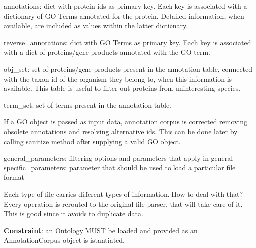 \documentclass[letterpaper,10pt,english]{sphinxmanual}
\begin{document}
annotations: dict with protein ids as primary key. Each key is associated with a dictionary of GO Terms annotated for the protein. Detailed information, when available, are included as values within the latter dictionary.

reverse\_annotations: dict with GO Terms as primary key. Each key is associated with a dict of proteins/gene products annotated with the GO term.

obj\_set: set of proteins/gene products present in the annotation table, connected with the taxon id of the organism they belong to, when this information is available. This table is useful to filter out proteins from uninteresting species.

term\_set: set of terms present in the annotation table.

If a GO object is passed as input data, annotation corpus is corrected removing obsolete annotations and resolving alternative ids.
This can be done later by calling sanitize method after supplying a valid GO object.

general\_parameters: filtering options and parameters that apply in general
specific\_parameters: parameter that should be used to load a particular file format

Each type of file carries different types of information. How to deal with that? Every operation is rerouted to the original file parser, that will take care of it. This is good since it avoids to duplicate data.

\textbf{Constraint}: an Ontology MUST be loaded and provided as an AnnotationCorpus object is istantiated.
\end{document}
